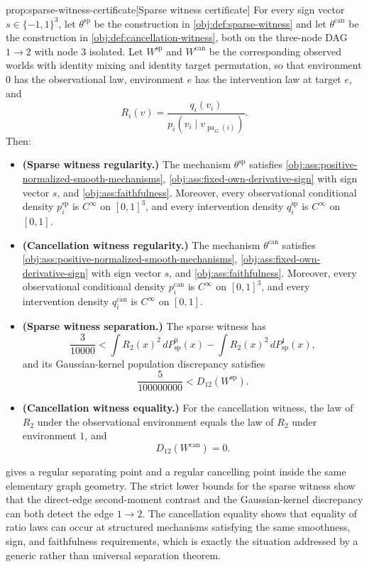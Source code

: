\documentclass[11pt]{article}
\begin{document}
\begin{theoremv}{prop:sparse-witness-certificate}[Sparse witness certificate]
For every sign vector \(s\in\{-1,1\}^3\), let \(\theta^{\mathrm{sp}}\) be the construction in \cref{obj:def:sparse-witness} and let \(\theta^{\mathrm{can}}\) be the construction in \cref{obj:def:cancellation-witness}, both on the three-node DAG \(1\to2\) with node \(3\) isolated. Let \(W^{\mathrm{sp}}\) and \(W^{\mathrm{can}}\) be the corresponding observed worlds with identity mixing and identity target permutation, so that environment \(0\) has the observational law, environment \(e\) has the intervention law at target \(e\), and
\[
R_i(v)=\frac{q_i(v_i)}{p_i(v_i\mid v_{\operatorname{pa}_G(i)})}.
\]
Then:
\begin{itemize}
\item \textbf{(Sparse witness regularity.)} The mechanism \(\theta^{\mathrm{sp}}\) satisfies \cref{obj:ass:positive-normalized-smooth-mechanisms}, \cref{obj:ass:fixed-own-derivative-sign} with sign vector \(s\), and \cref{obj:ass:faithfulness}. Moreover, every observational conditional density \(p_i^{\mathrm{sp}}\) is \(C^\infty\) on \([0,1]^3\), and every intervention density \(q_i^{\mathrm{sp}}\) is \(C^\infty\) on \([0,1]\).
\item \textbf{(Cancellation witness regularity.)} The mechanism \(\theta^{\mathrm{can}}\) satisfies \cref{obj:ass:positive-normalized-smooth-mechanisms}, \cref{obj:ass:fixed-own-derivative-sign} with sign vector \(s\), and \cref{obj:ass:faithfulness}. Moreover, every observational conditional density \(p_i^{\mathrm{can}}\) is \(C^\infty\) on \([0,1]^3\), and every intervention density \(q_i^{\mathrm{can}}\) is \(C^\infty\) on \([0,1]\).
\item \textbf{(Sparse witness separation.)} The sparse witness has
\[
\frac{3}{10000}
<
\int R_2(x)^2\,dP^0_{\mathrm{sp}}(x)
-
\int R_2(x)^2\,dP^1_{\mathrm{sp}}(x),
\]
and its Gaussian-kernel population discrepancy satisfies
\[
\frac{5}{100000000}<D_{12}(W^{\mathrm{sp}}).
\]
\item \textbf{(Cancellation witness equality.)} For the cancellation witness, the law of \(R_2\) under the observational environment equals the law of \(R_2\) under environment \(1\), and
\[
D_{12}(W^{\mathrm{can}})=0.
\]
\end{itemize}
\end{theoremv}

 gives a regular separating point and a regular cancelling point inside the same elementary graph geometry. The strict lower bounds for the sparse witness show that the direct-edge second-moment contrast and the Gaussian-kernel discrepancy can both detect the edge \(1\to2\). The cancellation equality shows that equality of ratio laws can occur at structured mechanisms satisfying the same smoothness, sign, and faithfulness requirements, which is exactly the situation addressed by a generic rather than universal separation theorem.
\end{document}
